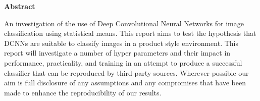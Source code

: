 \thispagestyle{empty}

\begin{center}
    {\LARGE\bf Abstract}
\end{center}

An investigation of the use of Deep Convolutional Neural Networks for image classification using statistical means. This report aims to test the hypothesis that DCNNs are suitable to classify images in a product style environment.
This report will investigate a number of hyper parameters and their impact in performance, practicality, and training in an attempt to produce a successful classifier that can be reproduced by third party sources.
Wherever possible our aim is full disclosure of any assumptions and any compromises that have been made to enhance the reproducibility of our results.